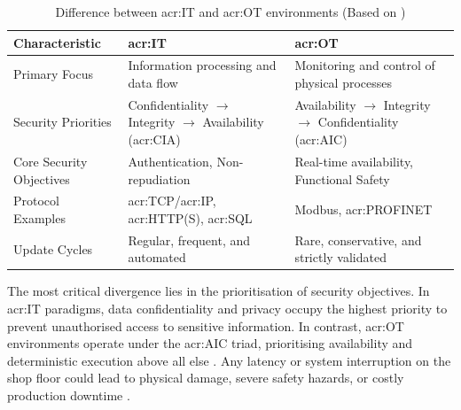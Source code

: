  \begin{table}[H]
 	\caption[Difference between \gls{acr:IT} and \gls{acr:OT} environments]{Difference between \gls{acr:IT} and \gls{acr:OT} environments (Based on \cite{hwi_ot_definition} \cite[p. 1, 199]{8586807})}
 	\label{tab:it_ot_comparison}
 	\centering
 	\begin{tabularx}{\textwidth}{l X X}
 		\toprule  
 		\textbf{Characteristic} & \textbf{\gls{acr:IT}} & \textbf{\gls{acr:OT}} \\ 
 		\midrule
 		Primary Focus & Information processing and data flow & Monitoring and control of physical processes \\ \addlinespace
 		Security Priorities & Confidentiality $\rightarrow$ \newline Integrity $\rightarrow$ \newline Availability (\acrshort{acr:CIA}) & Availability $\rightarrow$ \newline Integrity $\rightarrow$ \newline Confidentiality (\acrshort{acr:AIC}) \\ \addlinespace
 		Core Security Objectives & Authentication, \newline Non-repudiation & Real-time availability, \newline Functional Safety \\ \addlinespace
 		Protocol Examples & \acrshort{acr:TCP}/\gls{acr:IP}, \newline \acrshort{acr:HTTP}(S), \newline \acrshort{acr:SQL} & Modbus, \newline \acrshort{acr:PROFINET} \\ \addlinespace
 		Update Cycles & Regular, frequent, and automated & Rare, conservative, and strictly validated \\ 
 		\bottomrule  
 	\end{tabularx}
 \end{table}
 

The most critical divergence lies in the prioritisation of security objectives. In \gls{acr:IT} paradigms, data confidentiality and privacy occupy the highest priority to prevent unauthorised access to sensitive information. In contrast, \gls{acr:OT} environments operate under the \gls{acr:AIC} triad, prioritising availability and deterministic execution above all else \cite[p. 199]{8586807}. Any latency or system interruption on the shop floor could lead to physical damage, severe safety hazards, or costly production downtime \cite[p. 1]{8586807} \cite{hwi_ot_definition}.


